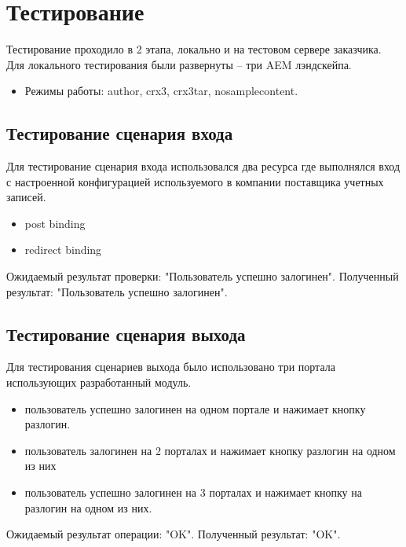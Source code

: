 \section{Тестирование}

Тестирование проходило в 2 этапа, локально и на тестовом сервере заказчика.
Для локального тестирования были развернуты – три AEM лэндскейпа.
\begin{itemize}
\item Режимы работы: author, crx3, crx3tar, nosamplecontent.
\end{itemize}

\subsection{Тестирование сценария входа}
Для тестирование сценария входа использовался два ресурса где выполнялся вход с настроенной конфигурацией используемого в компании поставщика учетных записей.
\begin{itemize}
\item post binding
\item redirect binding
\end{itemize}

Ожидаемый результат проверки: "Пользователь успешно залогинен". 
Полученный результат: "Пользователь успешно залогинен".

\subsection{Тестирование сценария выхода}
Для тестирования сценариев выхода было использовано три портала использующих разработанный модуль.
\begin{itemize}
\item пользователь успешно залогинен на одном портале и нажимает кнопку разлогин.
\item пользователь залогинен на 2 порталах и нажимает кнопку разлогин на одном из них
\item пользователь успешно залогинен на 3 порталах и нажимает кнопку на разлогин на одном из них.
\end{itemize}

Ожидаемый результат операции: "OK". 
Полученный результат: "OK".

%
%


